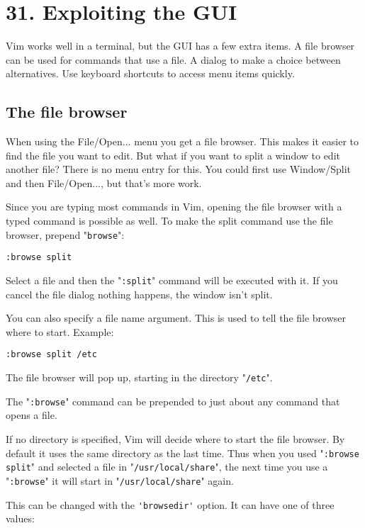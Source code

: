 \section{31. Exploiting the GUI}
Vim works well in a terminal, but the GUI has a few extra items.  A file
browser can be used for commands that use a file.  A dialog to make a choice
between alternatives.  Use keyboard shortcuts to access menu items quickly.
\subsection{The file browser}
When using the File/Open... menu you get a file browser.
This makes it easier to find the file you want to edit.
But what if you want to split a window to edit another file?  There is no menu entry for this.
You could first use Window/Split and then File/Open..., but that's more work.

Since you are typing most commands in Vim, opening the file browser with a typed command is possible as well.
To make the split command use the file browser, prepend "\verb!browse!":

\begin{Verbatim}[samepage=true]
 :browse split
\end{Verbatim}

Select a file and then the "\verb!:split!" command will be executed with it.
If you cancel the file dialog nothing happens, the window isn't split.

You can also specify a file name argument.
This is used to tell the file browser where to start.
Example:

\begin{Verbatim}[samepage=true]
 :browse split /etc
\end{Verbatim}

The file browser will pop up, starting in the directory "\verb!/etc!".

The "\verb!:browse!" command can be prepended to just about any command that opens a file.

If no directory is specified, Vim will decide where to start the file browser.
By default it uses the same directory as the last time.
Thus when you used "\verb!:browse split!" and selected a file in "\verb!/usr/local/share!", the next time you use a "\verb!:browse!" it will start in "\verb!/usr/local/share!" again.

This can be changed with the \verb!'browsedir'! option.  It can have one of three values:

